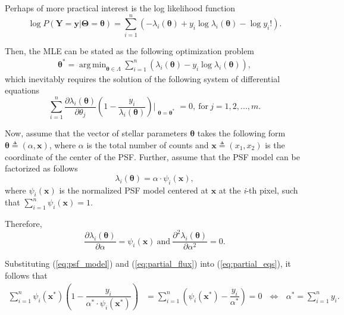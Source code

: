 \documentclass{rnaastex}
\DeclareMathOperator*{\argmin}{arg\,min}
\begin{document}
Perhaps of more practical interest is the log likelihood function
\begin{equation}
    \log P(\bm{Y} = \bm{y} | \bm{\Theta} = \bm{\theta}) = \sum_{i=1}^{n}\left(- \lambda_i(\bm{\theta}) + y_i\log\lambda_i(\bm{\theta}) - \log y_i !\right).
\end{equation}

Then, the MLE can be stated as the following optimization problem
\begin{align}
    \bm{\theta}^{*} = \argmin_{\bm{\theta} \in \Lambda} \sum_{i=1}^{n}\left(\lambda_i(\bm{\theta}) - y_i\log\lambda_i(\bm{\theta})\right),
\end{align}
which inevitably requires the solution of the following system of differential equations
\begin{equation}
    \sum_{i=1}^{n}\dfrac{\partial \lambda_i(\bm{\theta})}{\partial \theta_j}\left(1 - \dfrac{y_i}{\lambda_i(\bm{\theta})} \right)\Bigr|_{\substack{\bm{\theta}=\bm{\theta}^{*}}} = 0,~\mathrm{for}~j=1, 2, ..., m.
    \label{eq:partial_eqs}
\end{equation}

Now, assume that the vector of stellar parameters $\bm{\theta}$ takes the following form $\bm{\theta} \triangleq (\alpha, \bm{x})$, where $\alpha$ is the total number of counts and $\bm{x} \triangleq (x_1, x_2)$ is the coordinate of the center of the PSF. Further, assume that the PSF model can be factorized as follows
\begin{equation}
    \lambda_i(\bm{\theta}) = \alpha\cdot\psi_i(\bm{x}),
    \label{eq:psf_model}
\end{equation}
where $\psi_i(\bm{x})$ is the normalized PSF model centered at $\bm{x}$ at the \textit{i}-th pixel, such
that $\sum_{i=1}^{n}\psi_i(\bm{x})=1$.

Therefore,
\begin{equation}
    \dfrac{\partial{\lambda_i(\bm{\theta})}}{\partial \alpha} = \psi_i(\bm{x})~\text{and}~
    \dfrac{\partial^2{\lambda_i(\bm{\theta})}}{\partial \alpha^2} = 0.
    \label{eq:partial_flux}
\end{equation}

Substituting (\ref{eq:psf_model}) and (\ref{eq:partial_flux}) into (\ref{eq:partial_eqs}), it follows that
\begin{align}
    \sum_{i=1}^{n} \psi_i(\bm{x}^{*})\left(1 - \dfrac{y_i}{\alpha^{*}\cdot\psi_i(\bm{x}^{*})} \right) &= \sum_{i=1}^{n} \left(\psi_i(\bm{x}^{*}) -  \dfrac{y_i}{\alpha^{*}}\right) = 0~~~\Leftrightarrow~~~\alpha^{*} = \sum_{i=1}^{n} y_i.
    \label{eq:tada}
\end{align}
\end{document}

